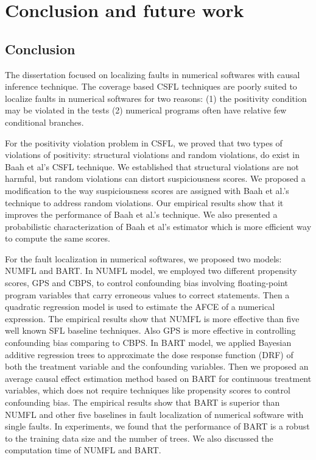 \chapter{Conclusion and future work}\label{conclusion}
\section{Conclusion}
The dissertation focused on localizing faults in numerical softwares with causal inference technique.  The coverage based CSFL techniques are  poorly suited to localize faults in numerical softwares for two reasons: (1) the positivity condition may be violated in the tests (2) numerical programs often have relative few conditional branches.

For the positivity violation problem in CSFL, we proved that two types of violations of positivity: structural violations and random violations, do exist in Baah et al’s CSFL technique. We established that structural violations are not harmful, but random violations can distort suspiciousness scores.  We proposed a modification to the way suspiciousness scores are assigned with Baah et al.’s technique to address random violations.  Our empirical results show that it improves the performance of Baah et al.’s technique. We also presented a probabilistic characterization of Baah et al’s estimator which is more efficient way to compute the same scores. 

For the fault localization in numerical softwares, we proposed two models: NUMFL and BART.  In NUMFL model, we employed two different propensity scores, GPS and CBPS, to control confounding bias involving floating-point program variables that carry erroneous values to correct statements.  Then a quadratic regression model is used to estimate the AFCE of a numerical expression. The empirical results show that NUMFL is more effective than five well known SFL baseline techniques. Also GPS is more effective in controlling confounding bias comparing to CBPS. In BART model, we applied Bayesian additive regression trees to approximate the dose response function (DRF) of both the treatment variable and the confounding variables. Then we proposed an average causal effect estimation method based on BART for continuous treatment variables, which does not require techniques like propensity scores to control confounding bias. The empirical results show that BART is superior than NUMFL and other five baselines in fault localization of numerical software with single faults. In experiments, we found that the performance of BART is a robust to the training data size and the number of trees. We also discussed the computation time of NUMFL and BART. 

